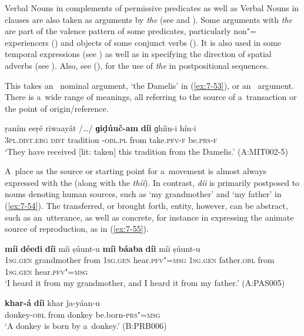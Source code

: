 Verbal Nouns in complements of permissive predicates as well as Verbal Nouns in  clauses are also taken as arguments by \textit{the} (see  and ). Some arguments with \textit{the} are part of the valence pattern of some predicates, particularly non"= experiencers () and objects of some conjunct verbs (). It is also used in some temporal expressions (see ) as well as in specifying the direction of spatial adverbs (see ). Also, see (), for the use of \textit{the} in postpositional sequences. 


 This  takes an~ nominal argument, `the Damelis' in (\ref{ex:7-53}), or an~  argument. There is a~wide range of meanings, all referring to the source of a~transaction or the point of origin/reference.

\begin{exe}
\ex
\label{ex:7-53}
\gll ṛaním eeṛé riwaayát /{\ldots}/ \textbf{ɡiḍúuč-am} \textbf{díi}  ɡhíin-i hín-i \\
\textsc{3pl.dist.erg} \textsc{dist} tradition {} \iliDameli-\textsc{obl.pl} from take.\textsc{pfv-f} be.\textsc{prs-f}\\
\glt `They have received [lit: taken] this tradition from the Damelis.' \mbox{(A:MIT002-5)}
\end{exe}

A~place as the source or starting point for a~movement is almost always expressed with the  (along with the  \textit{thíi}). In contrast, \textit{díi} is primarily postposed to nouns denoting human sources, such as `my grandmother' and `my father' in (\ref{ex:7-54}). The transferred, or brought forth, entity, however, can be abstract, such as an~utterance, as well as concrete, for instance in expressing the animate source of reproduction, as in (\ref{ex:7-55}).

\begin{exe}
\ex
\label{ex:7-54}
\gll \textbf{míi} \textbf{déedi} \textbf{díi} míi ṣúunt-u \textbf{míi} \textbf{báaba} \textbf{díi} míi ṣúunt-u\\
\textsc{1sg.gen} grandmother from \textsc{1sg.gen} hear.\textsc{pfv"=msg} \textsc{1sg.gen} father.\textsc{obl} from \textsc{1sg.gen} hear.\textsc{pfv"=msg}\\
\glt `I heard it from my grandmother, and I heard it from my father.' (A:PAS005)

\ex
\label{ex:7-55}
\gll \textbf{khar-á} \textbf{díi} khar ǰa-yáan-u \\
donkey-\textsc{obl} from donkey be.born\textsf{-}\textsc{prs"=msg} \\
\glt `A donkey is born by a~donkey.' (B:PRB006)
\end{exe}

